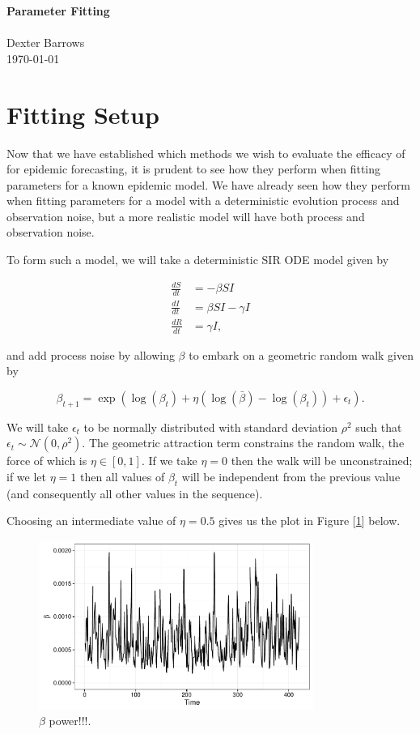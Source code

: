 \documentclass[12pt]{article}
\begin{document}
\noindent
{\LARGE {\bf Parameter Fitting} }
\\\\
Dexter Barrows\\
\today

\section{Fitting Setup}

	Now that we have established which methods we wish to evaluate the efficacy of for epidemic forecasting, it is prudent to see how they perform when fitting parameters for a known epidemic model. We have already seen how they perform when fitting parameters for a model with a deterministic evolution process and observation noise, but a more realistic model will have both process and observation noise.

	To form such a model, we will take a deterministic SIR ODE model given by

	\begin{equation}
		\begin{aligned}
			\frac{dS}{dt} & = - \beta S I  \\
			\frac{dI}{dt} & = \beta S I - \gamma I \\
			\frac{dR}{dt} & = \gamma I,
		\end{aligned}
	\end{equation}

	and add process noise by allowing $\beta$ to embark on a geometric random walk given by

	\begin{equation}
		\beta_{t+1} = \exp \left( \log(\beta_{t}) + \eta (\log(\bar{\beta}) - \log(\beta_{t})) + \epsilon_{t} \right).
	\end{equation}

	We will take $\epsilon_{t}$ to be normally distributed with standard deviation $\rho^2$ such that $\epsilon_{t} \sim \mathcal{N}(0,\rho^2)$. The geometric attraction term constrains the random walk, the force of which is $\eta \in [0,1]$. If we take $\eta = 0$ then the walk will be unconstrained; if we let $\eta = 1$ then all values of $\beta_t$ will be independent from the previous value (and consequently all other values in the sequence).

	Choosing an intermediate value of $\eta = 0.5$ gives us the plot in Figure [\ref{betaplot}] below.

	\begin{figure}[H]
        \centering
        \captionsetup{width=.8\linewidth}
        \includegraphics[width=0.8\textwidth]{./images/betaplot.pdf}
        \caption{$\beta$ power!!!.}
        \label{betaplot}
    \end{figure}
\end{document}
